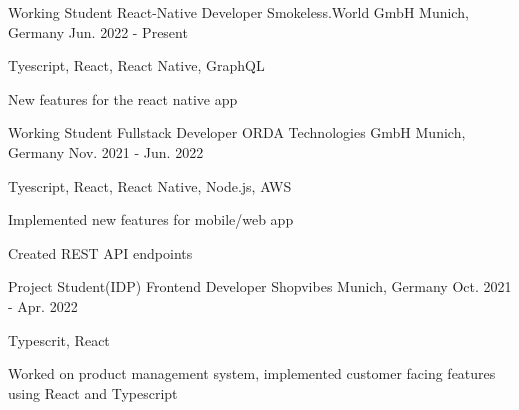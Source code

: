 

\begin{cventries}

  \cventry
    {Working Student React-Native Developer} %
    {Smokeless.World GmbH} %
    {Munich, Germany} %
    {Jun. 2022 - Present} %
    {
      \begin{cvitems} %
        \item {Tyescript, React, React Native, GraphQL}
        \item {New features for the react native app}
      \end{cvitems}
    }
  \cventry
    {Working Student Fullstack Developer} %
    {ORDA Technologies GmbH} %
    {Munich, Germany} %
    {Nov. 2021 - Jun. 2022} %
    {
      \begin{cvitems} %
        \item {Tyescript, React, React Native, Node.js, AWS}
        \item {Implemented new features for mobile/web app}
        \item {Created REST API endpoints}
      \end{cvitems}
    }
  \cventry
    {Project Student(IDP) Frontend Developer} %
    {Shopvibes} %
    {Munich, Germany} %
    {Oct. 2021 - Apr. 2022} %
    {
      \begin{cvitems} %
        \item {Typescrit, React}
        \item {Worked on product management system, implemented customer facing features using React and Typescript}
      \end{cvitems}
    }
\end{cventries}

